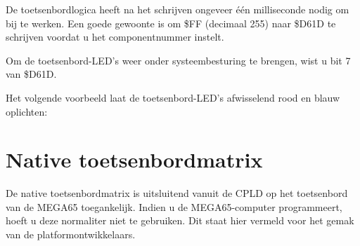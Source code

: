 De toetsenbordlogica heeft na het schrijven ongeveer één milliseconde nodig om bij te werken. Een goede gewoonte is om \$FF (decimaal 255) naar \$D61D te schrijven voordat u het componentnummer instelt.

Om de toetsenbord-LED's weer onder systeembesturing te brengen, wist u bit 7 van \$D61D.

Het volgende voorbeeld laat de toetsenbord-LED's afwisselend rood en blauw oplichten:



\newpage
\section{Native toetsenbordmatrix}

De native toetsenbordmatrix is uitsluitend vanuit de CPLD op het toetsenbord van de MEGA65 toegankelijk. Indien u de MEGA65-computer programmeert, hoeft u deze normaliter niet te gebruiken. Dit staat hier vermeld voor het gemak van de platformontwikkelaars.

